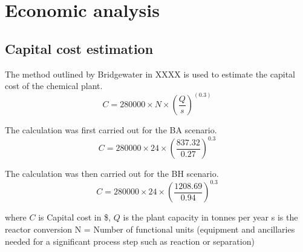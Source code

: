 
\section{Economic analysis}
\label{app:economics}
\subsection{Capital cost estimation}

The method outlined by Bridgewater in XXXX is used to estimate the capital cost of the chemical plant.
\begin{equation}
    C=280000 \times N \times (\frac{Q}{s})^(0.3)
\end{equation}

The calculation was first carried out for the BA scenario.
\begin{equation}
    C=280000 \times 24 \times (\frac{837.32}{0.27})^0.3
\end{equation}
    
The calculation was then carried out for the BH scenario.
\begin{equation}
    C=280000 \times 24 \times (\frac{1208.69}{0.94} )^0.3
\end{equation}

where $C$ is Capital cost in \$, $Q$ is the plant capacity in tonnes per year
s is the reactor conversion
N = Number of functional units (equipment and ancillaries needed for a significant process step such as reaction or separation)